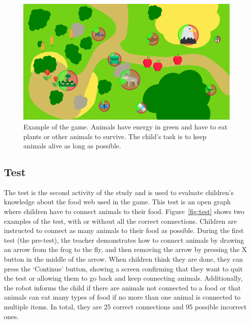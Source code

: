 \begin{figure}[ht]
	\centering
		\includegraphics[width=1\textwidth]{game.png}
		\caption{Example of the game. Animals have energy in green and have to eat plants or other animals to survive. The child's task is to keep animals alive as long as possible.}
		\label{fig:tutoring_game}
\end{figure}

\subsection{Test} \label{sec:tuto_test}

The test is the second activity of the study and is used to evaluate children's knowledge about the food web used in the game. This test is an open graph where children have to connect animals to their food. Figure~\ref{fig:test} shows two examples of the test, with or without all the correct connections. Children are instructed to connect as many animals to their food as possible. During the first test (the pre-test), the teacher demonstrates how to connect animals by drawing an arrow from the frog to the fly, and then removing the arrow by pressing the X button in the middle of the arrow. When children think they are done, they can press the `Continue' button, showing a screen confirming that they want to quit the test or allowing them to go back and keep connecting animals. Additionally, the robot informs the child if there are animals not connected to a food or that animals can eat many types of food if no more than one animal is connected to multiple items. In total, they are 25 correct connections and 95 possible incorrect ones.

